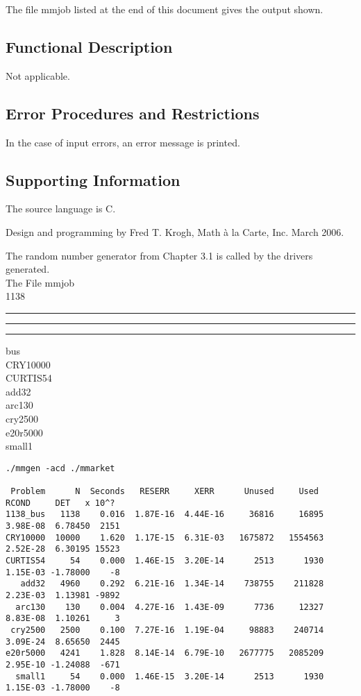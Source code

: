 \documentclass[twoside]{MATH77}
\DeclareRobustCommand{\us}{\rule{.2pt}{0pt}\rule[-.8pt]{.4em}{.5pt}\rule{.7pt}{0pt}}
\begin{document}
The file mmjob listed at the end of this document gives the output
shown.

\subsection{Functional Description}

Not applicable.

\subsection{Error Procedures and Restrictions}
\label{sec:errors}
In the case of input errors, an error message is printed.

\subsection{Supporting Information}

The source language is C.

Design and programming by Fred T. Krogh, Math \`a la Carte, Inc.
March 2006.

The random number generator from Chapter 3.1 is called by the drivers
generated.
\begcode
\vspace {10pt}
~\\
\normalsize
The File mmjob\\
1138\us bus\\
CRY10000\\
CURTIS54\\
add32\\
arc130\\
cry2500\\
e20r5000\\
small1\\

\begin{verbatim}
./mmgen -acd ./mmarket

 Problem      N  Seconds   RESERR     XERR      Unused     Used    RCOND     DET   x 10^?
1138_bus   1138    0.016  1.87E-16  4.44E-16     36816     16895  3.98E-08  6.78450  2151
CRY10000  10000    1.620  1.17E-15  6.31E-03   1675872   1554563  2.52E-28  6.30195 15523
CURTIS54     54    0.000  1.46E-15  3.20E-14      2513      1930  1.15E-03 -1.78000    -8
   add32   4960    0.292  6.21E-16  1.34E-14    738755    211828  2.23E-03  1.13981 -9892
  arc130    130    0.004  4.27E-16  1.43E-09      7736     12327  8.83E-08  1.10261     3
 cry2500   2500    0.100  7.27E-16  1.19E-04     98883    240714  3.09E-24  8.65650  2445
e20r5000   4241    1.828  8.14E-14  6.79E-10   2677775   2085209  2.95E-10 -1.24088  -671
  small1     54    0.000  1.46E-15  3.20E-14      2513      1930  1.15E-03 -1.78000    -8
\end{verbatim}
\end{document}
